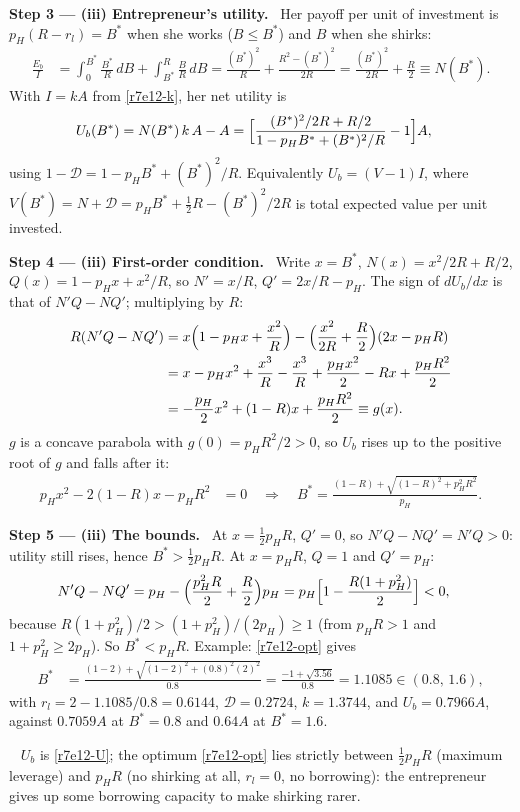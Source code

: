 \documentclass[11pt,a4paper]{article}
\newcommand{\step}[2]{\par\medskip\noindent\textbf{Step #1 --- #2.}~}
\newcommand{\answer}[1]{\par\smallskip\noindent\fbox{\textbf{Answer #1.}}~}
\begin{document}
\step{3}{(iii) Entrepreneur's utility} Her payoff per unit of investment is $p_H(R-r_l)=B^*$ when she works ($B\le B^*$) and $B$ when she shirks:
\begin{align}
  \frac{E_b}{I} &= \int_0^{B^*}\frac{B^*}{R}\,dB + \int_{B^*}^{R}\frac{B}{R}\,dB = \frac{(B^*)^2}{R} + \frac{R^2-(B^*)^2}{2R} = \frac{(B^*)^2}{2R}+\frac{R}{2} \equiv N(B^*). \nonumber
\end{align}
With $I=kA$ from \eqref{r7e12-k}, her net utility is
\begin{align}
  U_b(B^*) &= N(B^*)\,k\,A - A = \Bigl[\frac{(B^*)^2/2R+R/2}{1-p_HB^*+(B^*)^2/R}-1\Bigr]A, \label{r7e12-U}
\end{align}
using $1-\mathcal D = 1-p_HB^*+(B^*)^2/R$. Equivalently $U_b=(V-1)I$, where $V(B^*)=N+\mathcal D=p_HB^*+\tfrac12R-(B^*)^2/2R$ is total expected value per unit invested.

\step{4}{(iii) First-order condition} Write $x=B^*$, $N(x)=x^2/2R+R/2$, $Q(x)=1-p_Hx+x^2/R$, so $N'=x/R$, $Q'=2x/R-p_H$. The sign of $dU_b/dx$ is that of $N'Q-NQ'$; multiplying by $R$:
\begin{align}
  R(N'Q-NQ') &= x\Bigl(1-p_Hx+\frac{x^2}{R}\Bigr) - \Bigl(\frac{x^2}{2R}+\frac R2\Bigr)(2x-p_HR) \nonumber\\
  &= x - p_Hx^2 + \frac{x^3}{R} - \frac{x^3}{R} + \frac{p_Hx^2}{2} - Rx + \frac{p_HR^2}{2} \nonumber\\
  &= -\frac{p_H}{2}x^2 + (1-R)x + \frac{p_HR^2}{2} \equiv g(x). \label{r7e12-g}
\end{align}
$g$ is a concave parabola with $g(0)=p_HR^2/2>0$, so $U_b$ rises up to the positive root of $g$ and falls after it:
\begin{align}
  p_Hx^2 - 2(1-R)x - p_HR^2 &= 0 \quad\Longrightarrow\quad B^* = \frac{(1-R)+\sqrt{(1-R)^2+p_H^2R^2}}{p_H}. \label{r7e12-opt}
\end{align}

\step{5}{(iii) The bounds} At $x=\tfrac12p_HR$, $Q'=0$, so $N'Q-NQ'=N'Q>0$: utility still rises, hence $B^*>\tfrac12p_HR$. At $x=p_HR$, $Q=1$ and $Q'=p_H$:
\begin{align}
  N'Q-NQ' &= p_H - \Bigl(\frac{p_H^2R}{2}+\frac R2\Bigr)p_H = p_H\Bigl[1-\frac{R(1+p_H^2)}{2}\Bigr] < 0, \nonumber
\end{align}
because $R(1+p_H^2)/2>(1+p_H^2)/(2p_H)\ge1$ (from $p_HR>1$ and $1+p_H^2\ge 2p_H$). So $B^*<p_HR$. Example: \eqref{r7e12-opt} gives
\begin{align}
  B^* &= \frac{(1-2)+\sqrt{(1-2)^2+(0.8)^2(2)^2}}{0.8} = \frac{-1+\sqrt{3.56}}{0.8} = 1.1085 \in (0.8,\,1.6), \nonumber
\end{align}
with $r_l=2-1.1085/0.8=0.6144$, $\mathcal D=0.2724$, $k=1.3744$, and $U_b=0.7966A$, against $0.7059A$ at $B^*=0.8$ and $0.64A$ at $B^*=1.6$.
\answer{(iii)} $U_b$ is \eqref{r7e12-U}; the optimum \eqref{r7e12-opt} lies strictly between $\tfrac12p_HR$ (maximum leverage) and $p_HR$ (no shirking at all, $r_l=0$, no borrowing): the entrepreneur gives up some borrowing capacity to make shirking rarer.
\end{document}
